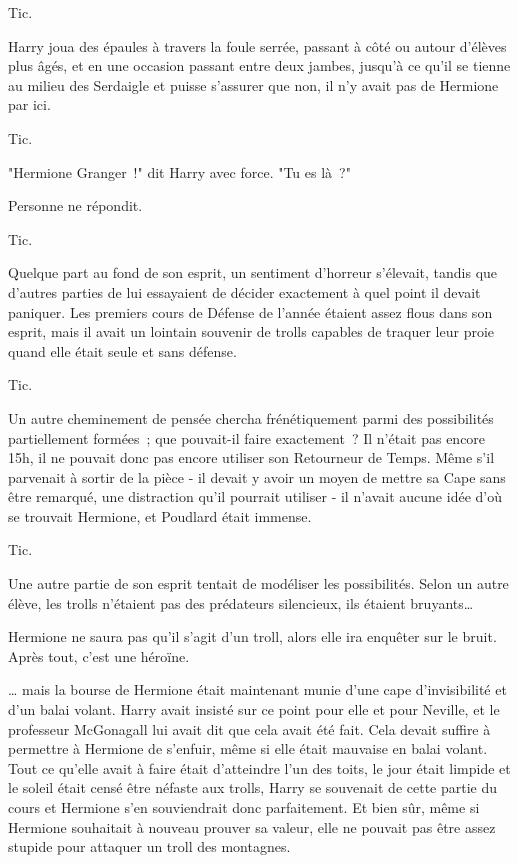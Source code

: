 Tic.

Harry joua des épaules à travers la foule serrée, passant à côté ou autour d'élèves plus âgés, et en une occasion passant entre deux jambes, jusqu'à ce qu'il se tienne au milieu des Serdaigle et puisse s'assurer que non, il n'y avait pas de Hermione par ici.

Tic.

"Hermione Granger~!" dit Harry avec force. "Tu es là~?"

Personne ne répondit.

Tic.

Quelque part au fond de son esprit, un sentiment d'horreur s'élevait, tandis que d'autres parties de lui essayaient de décider exactement à quel point il devait paniquer. Les premiers cours de Défense de l'année étaient assez flous dans son esprit, mais il avait un lointain souvenir de trolls capables de traquer leur proie quand elle était seule et sans défense.

Tic.

Un autre cheminement de pensée chercha frénétiquement parmi des possibilités partiellement formées~; que pouvait-il faire exactement~? Il n'était pas encore 15h, il ne pouvait donc pas encore utiliser son Retourneur de Temps. Même s'il parvenait à sortir de la pièce - il devait y avoir un moyen de mettre sa Cape sans être remarqué, une distraction qu'il pourrait utiliser - il n'avait aucune idée d'où se trouvait Hermione, et Poudlard était immense.

Tic.

Une autre partie de son esprit tentait de modéliser les possibilités. Selon un autre élève, les trolls n'étaient pas des prédateurs silencieux, ils étaient bruyants…

Hermione ne saura pas qu'il s'agit d'un troll, alors elle ira enquêter sur le bruit. Après tout, c'est une héroïne.

… mais la bourse de Hermione était maintenant munie d'une cape d'invisibilité et d'un balai volant. Harry avait insisté sur ce point pour elle et pour Neville, et le professeur McGonagall lui avait dit que cela avait été fait. Cela devait suffire à permettre à Hermione de s'enfuir, même si elle était mauvaise en balai volant. Tout ce qu'elle avait à faire était d'atteindre l'un des toits, le jour était limpide et le soleil était censé être néfaste aux trolls, Harry se souvenait de cette partie du cours et Hermione s'en souviendrait donc parfaitement. Et bien sûr, même si Hermione souhaitait à nouveau prouver sa valeur, elle ne pouvait pas être assez stupide pour attaquer un troll des montagnes.

